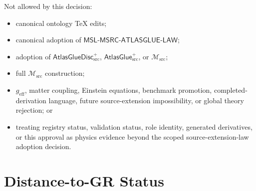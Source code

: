\documentclass[11pt]{article}
\newcommand{\Msrc}{\mathcal{M}_{\mathrm{src}}}
\newcommand{\geff}{g_{\mathrm{eff}}}
\newcommand{\AtlasGlue}{\mathsf{AtlasGlue}_{\mathrm{src}}^{+}}
\newcommand{\AtlasGlueDisc}{\mathsf{AtlasGlueDisc}_{\mathrm{src}}^{+}}
\newcommand{\MSL}{\mathsf{MSL}\mbox{-}\mathsf{MSRC}\mbox{-}\mathsf{ATLASGLUE}\mbox{-}\mathsf{LAW}}
\begin{document}
Not allowed by this decision:
\begin{itemize}
  \item canonical ontology TeX edits;
  \item canonical adoption of \(\MSL\);
  \item adoption of \(\AtlasGlueDisc\), \(\AtlasGlue\), or \(\Msrc\);
  \item full \(\Msrc\) construction;
  \item \(\geff\), matter coupling, Einstein equations, benchmark promotion,
  completed-derivation language, future source-extension impossibility, or
  global theory rejection; or
  \item treating registry status, validation status, role identity, generated
  derivatives, or this approval as physics evidence beyond the scoped
  source-extension-law adoption decision.
\end{itemize}

\section{Distance-to-GR Status}
\end{document}
